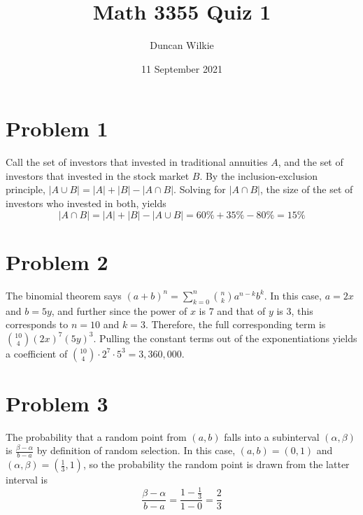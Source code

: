 \documentclass{article}
\title{Math 3355 Quiz 1}
\author{Duncan Wilkie}
\date{11 September 2021}
\begin{document}
\maketitle

\section*{Problem 1}
Call the set of investors that invested in traditional annuities $A$, and the set of investors that invested in the stock market $B$.
By the inclusion-exclusion principle, $|A\cup B|=|A| + |B| - |A\cap B|$. Solving for $|A\cap B|$, the size of the set of investors who invested in both, yields \[|A\cap B| = |A|+|B|-|A\cup B| = 60\% + 35\% - 80\% = 15\%\]

\section*{Problem 2}
The binomial theorem says $(a+b)^n = \sum_{k=0}^n\binom{n}{k}a^{n-k}b^k$. In this case, $a=2x$ and $b=5y$, and further since the power of $x$ is 7 and that of $y$ is 3, this corresponds to $n=10$ and $k=3$.
Therefore, the full corresponding term is $\binom{10}{4}(2x)^7(5y)^3$.
Pulling the constant terms out of the exponentiations yields a coefficient of $\binom{10}{4}\cdot2^7\cdot5^3 = 3,360,000$.
\section*{Problem 3}
The probability that a random point from $(a,b)$ falls into a subinterval $(\alpha, \beta)$ is $\frac{\beta-\alpha}{b-a}$ by definition of random selection.
In this case, $(a,b) = (0,1)$ and $(\alpha, \beta) = (\frac{1}{3}, 1)$, so the probability the random point is drawn from the latter interval is \[\frac{\beta-\alpha}{b-a} = \frac{1-\frac{1}{3}}{1-0}=\frac{2}{3}\]
\end{document}
